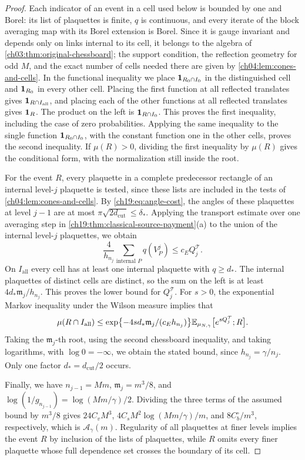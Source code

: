 \begin{proof}
Each indicator of an event in a cell used below is bounded by one and Borel: its list of plaquettes is finite, $q$ is continuous, and every iterate of the block averaging map with its Borel extension is Borel. Since it is gauge invariant and depends only on links internal to its cell, it belongs to the algebra of \cref{ch03:thm:original-chessboard}; the support condition, the reflection geometry for odd $M$, and the exact number of cells needed there are given by \cref{ch04:lem:cones-and-cells}. In the functional inequality we place $\mathbf 1_{R_0\cap I_0}$ in the distinguished cell and $\mathbf 1_{R_0}$ in every other cell. Placing the first function at all reflected translates gives $\mathbf 1_{R\cap I_{\mathrm{all}}}$, and placing each of the other functions at all reflected translates gives $\mathbf 1_R$. The product on the left is $\mathbf 1_{R\cap I_0}$. This proves the first inequality, including the case of zero probabilities. Applying the same inequality to the single function $\mathbf 1_{R_0\cap I_0}$, with the constant function one in the other cells, proves the second inequality. If $\mu(R)>0$, dividing the first inequality by $\mu(R)$ gives the conditional form, with the normalization still inside the root.

For the event $R$, every plaquette in a complete predecessor rectangle of an internal level-$j$ plaquette is tested, since these lists are included in the tests of \cref{ch04:lem:cones-and-cells}. By \eqref{ch19:eq:angle-cost}, the angles of these plaquettes at level $j-1$ are at most $\pi\sqrt{2d_{\mathrm{cut}}}\le\delta_*$. Applying the transport estimate over one averaging step in \cref{ch19:thm:classical-source-payment}(a) to the union of the internal level-$j$ plaquettes, we obtain
\[
 \frac4{h_{n_j}}\sum_{\text{internal }P}q(V_P^j)\le c_EQ_j^{\mathcal T}.
\]
On $I_{\mathrm{all}}$ every cell has at least one internal plaquette with $q\ge d_*$. The internal plaquettes of distinct cells are distinct, so the sum on the left is at least $4d_*\mathfrak m_j/h_{n_j}$. This proves the lower bound for $Q_j^{\mathcal T}$. For $s>0$, the exponential Markov inequality under the Wilson measure implies that
\[
 \mu(R\cap I_{\mathrm{all}})\le\exp\bigl\{-4sd_*\mathfrak m_j/(c_Eh_{n_j})\bigr\}\mathbb E_{\mu_{N,\gamma}}\bigl[e^{sQ_j^{\mathcal T}};R\bigr].
\]
Taking the $\mathfrak m_j$-th root, using the second chessboard inequality, and taking logarithms, with $\log0=-\infty$, we obtain the stated bound, since $h_{n_j}=\gamma/n_j$. Only one factor $d_*=d_{\mathrm{cut}}/2$ occurs.

Finally, we have $n_{j-1}=Mm$, $\mathfrak m_j=m^3/8$, and $\log(1/g_{n_{j-1}})=\log(Mm/\gamma)/2$. Dividing the three terms of the assumed bound by $m^3/8$ gives $24C_vM^3$, $4C_sM^2\log(Mm/\gamma)/m$, and $8C_b^\circ/m^3$, respectively, which is $\mathcal A_\gamma(m)$. Regularity of all plaquettes at finer levels implies the event $R$ by inclusion of the lists of plaquettes, while $R$ omits every finer plaquette whose full dependence set crosses the boundary of its cell.
\end{proof}

